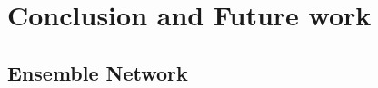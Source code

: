 \chapter{Conclusion and Future work}
\label{chap:conclusion}

\section{Ensemble Network}
\label{sec:ensembleconclusion}
